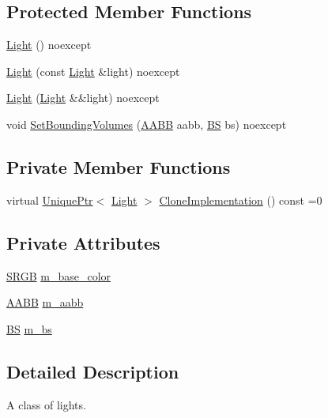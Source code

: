 \subsection*{Protected Member Functions}
\begin{DoxyCompactItemize}
\item 
\hyperlink{classmage_1_1_light_a69660fe611718db38c3951f49804ec3e}{Light} () noexcept
\item 
\hyperlink{classmage_1_1_light_a022d4386ddd9666ea7292b1d51cb87d5}{Light} (const \hyperlink{classmage_1_1_light}{Light} \&light) noexcept
\item 
\hyperlink{classmage_1_1_light_a311871137a12ac2c27cdb2d4a2d525b7}{Light} (\hyperlink{classmage_1_1_light}{Light} \&\&light) noexcept
\item 
void \hyperlink{classmage_1_1_light_a4d2c35b96e8aaa718821c79e0e123025}{Set\+Bounding\+Volumes} (\hyperlink{structmage_1_1_a_a_b_b}{A\+A\+BB} aabb, \hyperlink{structmage_1_1_b_s}{BS} bs) noexcept
\end{DoxyCompactItemize}
\subsection*{Private Member Functions}
\begin{DoxyCompactItemize}
\item 
virtual \hyperlink{namespacemage_a3316d7143a973e37adf1110f2e80ca31}{Unique\+Ptr}$<$ \hyperlink{classmage_1_1_light}{Light} $>$ \hyperlink{classmage_1_1_light_aa613d76a1ebda69efde853d15f75490c}{Clone\+Implementation} () const =0
\end{DoxyCompactItemize}
\subsection*{Private Attributes}
\begin{DoxyCompactItemize}
\item 
\hyperlink{structmage_1_1_s_r_g_b}{S\+R\+GB} \hyperlink{classmage_1_1_light_a31c237ed5716313d0c8916186bef4dab}{m\+\_\+base\+\_\+color}
\item 
\hyperlink{structmage_1_1_a_a_b_b}{A\+A\+BB} \hyperlink{classmage_1_1_light_a2c9190a763a1f37f7639a02bef01279d}{m\+\_\+aabb}
\item 
\hyperlink{structmage_1_1_b_s}{BS} \hyperlink{classmage_1_1_light_a926df9e12442c630d252fae852b8fc57}{m\+\_\+bs}
\end{DoxyCompactItemize}


\subsection{Detailed Description}
A class of lights. 

